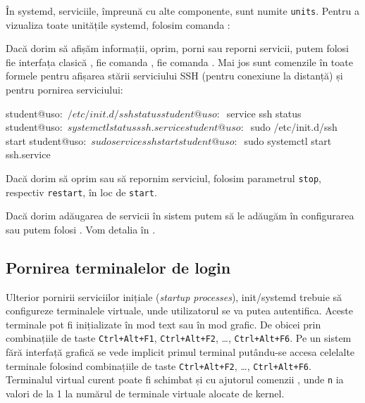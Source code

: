 În systemd, serviciile, împreună cu alte componente, sunt numite \texttt{units}.
Pentru a vizualiza toate unitățile systemd, folosim comanda :


Dacă dorim să afișăm informații, oprim, porni sau reporni servicii, putem folosi fie interfața clasică , fie comanda , fie comanda .
 Mai jos sunt comenzile în toate formele pentru afișarea stării serviciului SSH (pentru conexiune la distanță) și pentru pornirea serviciului:

\begin{screen}
student@uso:~$ /etc/init.d/ssh status
student@uso:~$ service ssh status
student@uso:~$ systemctl status ssh.service
student@uso:~$ sudo /etc/init.d/ssh start
student@uso:~$ sudo service ssh start
student@uso:~$ sudo systemctl start ssh.service
\end{screen}

Dacă dorim să oprim sau să repornim serviciul, folosim parametrul \texttt{stop}, respectiv \texttt{restart}, în loc de \texttt{start}.

Dacă dorim adăugarea de servicii în sistem putem să le adăugăm în configurarea  sau putem folosi .
Vom detalia în .

\subsection{Pornirea terminalelor de login}
\label{sec:boot:init-linux:login}

Ulterior pornirii serviciilor inițiale (\textit{startup processes}), init/systemd trebuie să configureze terminalele virtuale, unde utilizatorul se va putea autentifica.
Aceste terminale pot fi inițializate în mod text sau în mod grafic.
 De obicei prin combinațiile de taste \texttt{Ctrl+Alt+F1}, \texttt{Ctrl+Alt+F2}, \ldots, \texttt{Ctrl+Alt+F6}.
Pe un sistem fără interfață grafică se vede implicit primul terminal putându-se accesa celelalte terminale folosind combinațiile de taste \texttt{Ctrl+Alt+F2}, \ldots, \texttt{Ctrl+Alt+F6}.
 Terminalul virtual curent poate fi schimbat și cu ajutorul comenzii , unde \texttt{n} ia valori de la 1 la numărul de terminale virtuale alocate de kernel.

